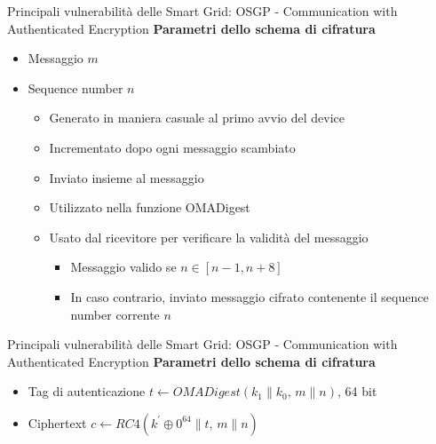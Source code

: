 \begin{frame}{Principali vulnerabilità delle Smart Grid: OSGP - Communication with Authenticated Encryption}
	\textbf{Parametri dello schema di cifratura}
	\begin{itemize}[<+- | alert@+>]
		\item Messaggio $m$
		\item Sequence number $n$
		\begin{itemize}
			\item Generato in maniera casuale al primo avvio del device
			\item Incrementato dopo ogni messaggio scambiato
			\item Inviato insieme al messaggio
			\item Utilizzato nella funzione OMADigest
			\item Usato dal ricevitore per verificare la validità del messaggio
			\begin{itemize}
				\item Messaggio valido se $n \in [n-1, n+8]$
				\item In caso contrario, inviato messaggio cifrato contenente il sequence number corrente $n$
			\end{itemize}
		\end{itemize}
	\end{itemize}
\end{frame}

\begin{frame}{Principali vulnerabilità delle Smart Grid: OSGP - Communication with Authenticated Encryption}
	\textbf{Parametri dello schema di cifratura}
	\begin{itemize}
		\item Tag di autenticazione $t \gets OMADigest(k_1\|k_0,\,m\|n)$, 64 bit
		\item Ciphertext $c \gets RC4(k^{\prime} \oplus 0^{64}\|t,\,m\|n)$
	\end{itemize}
\end{frame}

